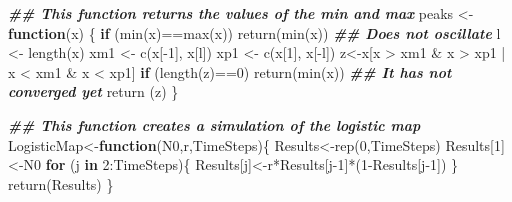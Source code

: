 \documentclass[
]{article}
\newenvironment{Shaded}{\begin{snugshade}}{\end{snugshade}}
\newcommand{\ControlFlowTok}[1]{\textcolor[rgb]{0.13,0.29,0.53}{\textbf{#1}}}
\newcommand{\DecValTok}[1]{\textcolor[rgb]{0.00,0.00,0.81}{#1}}
\newcommand{\DocumentationTok}[1]{\textcolor[rgb]{0.56,0.35,0.01}{\textbf{\textit{#1}}}}
\newcommand{\FunctionTok}[1]{\textcolor[rgb]{0.00,0.00,0.00}{#1}}
\newcommand{\NormalTok}[1]{#1}
\newcommand{\OtherTok}[1]{\textcolor[rgb]{0.56,0.35,0.01}{#1}}
\newcommand{\SpecialCharTok}[1]{\textcolor[rgb]{0.00,0.00,0.00}{#1}}
\begin{document}
\begin{Shaded}
\begin{Highlighting}[]
\DocumentationTok{\#\# This function returns the values of the min and max }
\NormalTok{peaks }\OtherTok{\textless{}{-}} \ControlFlowTok{function}\NormalTok{(x) \{}
  \ControlFlowTok{if}\NormalTok{ (}\FunctionTok{min}\NormalTok{(x)}\SpecialCharTok{==}\FunctionTok{max}\NormalTok{(x)) }\FunctionTok{return}\NormalTok{(}\FunctionTok{min}\NormalTok{(x)) }\DocumentationTok{\#\# Does not oscillate }
\NormalTok{  l }\OtherTok{\textless{}{-}} \FunctionTok{length}\NormalTok{(x) }
\NormalTok{  xm1 }\OtherTok{\textless{}{-}} \FunctionTok{c}\NormalTok{(x[}\SpecialCharTok{{-}}\DecValTok{1}\NormalTok{], x[l])}
\NormalTok{  xp1 }\OtherTok{\textless{}{-}} \FunctionTok{c}\NormalTok{(x[}\DecValTok{1}\NormalTok{], x[}\SpecialCharTok{{-}}\NormalTok{l]) }
\NormalTok{  z}\OtherTok{\textless{}{-}}\NormalTok{x[x }\SpecialCharTok{\textgreater{}}\NormalTok{ xm1 }\SpecialCharTok{\&}\NormalTok{ x }\SpecialCharTok{\textgreater{}}\NormalTok{ xp1 }\SpecialCharTok{|}\NormalTok{ x }\SpecialCharTok{\textless{}}\NormalTok{ xm1 }\SpecialCharTok{\&}\NormalTok{ x }\SpecialCharTok{\textless{}}\NormalTok{ xp1] }
  \ControlFlowTok{if}\NormalTok{ (}\FunctionTok{length}\NormalTok{(z)}\SpecialCharTok{==}\DecValTok{0}\NormalTok{) }\FunctionTok{return}\NormalTok{(}\FunctionTok{min}\NormalTok{(x)) }\DocumentationTok{\#\# It has not converged yet }
  \FunctionTok{return}\NormalTok{ (z)}
\NormalTok{\} }

\DocumentationTok{\#\# This function creates a simulation of the logistic map }
\NormalTok{LogisticMap}\OtherTok{\textless{}{-}}\ControlFlowTok{function}\NormalTok{(N0,r,TimeSteps)\{}
\NormalTok{  Results}\OtherTok{\textless{}{-}}\FunctionTok{rep}\NormalTok{(}\DecValTok{0}\NormalTok{,TimeSteps) }
\NormalTok{  Results[}\DecValTok{1}\NormalTok{]}\OtherTok{\textless{}{-}}\NormalTok{N0 }
  \ControlFlowTok{for}\NormalTok{ (j }\ControlFlowTok{in} \DecValTok{2}\SpecialCharTok{:}\NormalTok{TimeSteps)\{}
\NormalTok{    Results[j]}\OtherTok{\textless{}{-}}\NormalTok{r}\SpecialCharTok{*}\NormalTok{Results[j}\DecValTok{{-}1}\NormalTok{]}\SpecialCharTok{*}\NormalTok{(}\DecValTok{1}\SpecialCharTok{{-}}\NormalTok{Results[j}\DecValTok{{-}1}\NormalTok{])}
\NormalTok{  \} }
  \FunctionTok{return}\NormalTok{(Results)}
\NormalTok{\} }


\end{Highlighting}
\end{Shaded}
\end{document}
